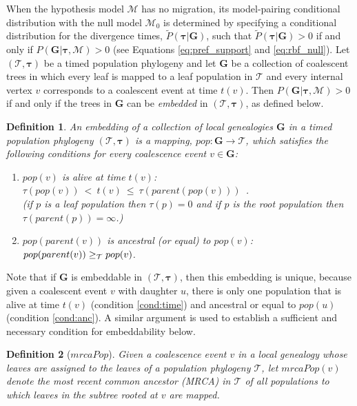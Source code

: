 \documentclass[11pt]{article}
\newcommand{\vect}[1]{\boldsymbol{\mathbf{#1}}}
\newcommand{\M}{\mathcal{M}}
\newcommand{\Tr}{\mathcal{T}}
\newcommand{\G}{\vect{G}}
\newcommand{\Pref}{\widetilde{P}}
\newcommand{\1}{\mathbbm{1}}
\newtheorem{definition}{Definition}
\newcommand{\taus}{\vect\tau}
\begin{document}
When the hypothesis model $\M$ has no migration, its model-pairing conditional distribution with the null model $\M_0$ is determined by specifying a conditional
distribution for the divergence times, $\Pref(\taus|\G)$, such that $\Pref(\taus|\G)>0$ if and only if $P(\G|\taus,\M)>0$
(see Equations \ref{eq:pref_support} and \ref{eq:rbf_null}).
%
Let $(\Tr,\taus)$ be a timed population phylogeny and let $\G$ be a collection of coalescent trees in which every leaf is mapped to a leaf population in $\Tr$
and  every internal vertex $v$ corresponds to a coalescent event at time $t(v)$.
Then $P(\G|\taus,\M)>0$ if and only if the trees in $\G$ can be \emph{embedded} in  $(\Tr,\taus)$, as defined below.
%
\begin{definition}\label{def:embed}
 An embedding of a collection of local genealogies $\G$ in a timed population phylogeny $(\Tr,\taus)$ is a mapping, $pop:\G\rightarrow\Tr$,
 which satisfies the following conditions for every coalescence event $v\in\G$:
 \begin{enumerate}
  \item $pop(v)$ is alive at time $t(v)$:~~ $\tau(pop(v)) ~<~ t(v) ~\leq~ \tau(parent(pop(v)))$~.\label{cond:time}\\
  (if $p$ is a leaf population then $\tau(p)=0$ and if $p$ is the root population then $\tau(parent(p))=\infty$.)
  \item $pop(parent(v))$ is ancestral (or equal) to $pop(v)$:~~ $pop(parent(v)) \anc pop(v)$.\label{cond:anc}
 \end{enumerate}
\end{definition}

%
%
Note that if $\G$ is embeddable in $(\Tr,\taus)$, then this embedding is unique, because given a coalescent event $v$ with daughter $u$,
there is only one population that is  alive at time $t(v)$ (condition \ref{cond:time}) and ancestral or equal to $pop(u)$ (condition \ref{cond:anc}).
%
A similar argument is used to establish a sufficient and necessary condition for embeddability below.
%
\begin{definition}[$mrcaPop$]\label{def:tmrca_pop}
 Given a coalescence event $v$ in a local genealogy whose leaves are assigned to the leaves of a population phylogeny $\Tr$,
 let ${mrcaPop(v)}$ denote the most recent common ancestor (MRCA) in $\Tr$ of all populations to which leaves in the subtree rooted at $v$ are mapped. %
\end{definition}
\end{document}
